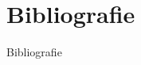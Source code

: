 \documentclass{beamer}
\begin{document}
\section{Bibliografie}
\begin{frame}[allowframebreaks]{Bibliografie}
~\cite{javaTpoint}
~\cite{alghdesign}
~\cite{nqueensartcl}

    
    
\end{frame}
\end{document}
